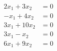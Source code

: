 \begin{align*}
2x_1  + 3x_2  &= 0 \\
-x_1 + 4x_2  &=  0 \\
3x_1 +10x_2  &=  0  \\
3x_1 - x_2  &=  0  \\
6x_1 + 9x_2  &=  0  
\end{align*}